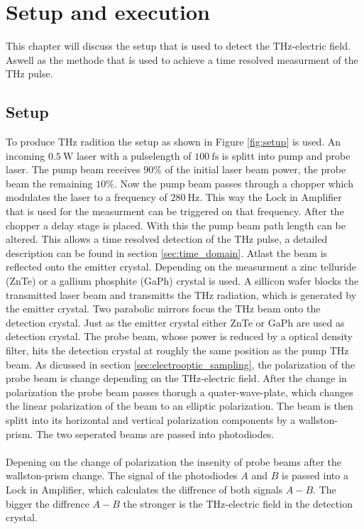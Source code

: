 \chapter{Setup and execution}
This chapter will discuss the setup that is used to detect the $\si{\tera\hertz}$-electric field.
Aswell as the methode that ís used to achieve a time resolved measurment of the $\si{\tera\hertz}$ pulse.

\section{Setup}
\label{sec:setup}
To produce $\si{\tera\hertz}$ radition the setup as shown in Figure \ref{fig:setup} is used.
An incoming $\SI{0.5}{\W}$ laser with a pulselength of $\SI{100}{\femto\second}$ is splitt into pump and probe laser.
The pump beam receives $90\%$ of the initial laser beam power, the probe beam the remaining $10\%$.
Now the pump beam passes through a chopper which modulates the laser to a frequency of $\SI{280}{\hertz}$.
This way the Lock in Amplifier that is used for the measurment can be triggered on that frequency.
After the chopper a delay stage is placed.
With this the pump beam path length can be altered.
This allows a time resolved detection of the $\si{\tera\hertz}$ pulse, a detailed description can be found in section \ref{sec:time_domain}.
Atlast the beam is reflected onto the emitter crystal.
Depending on the measurment a zinc telluride (ZnTe) or a gallium phosphite (GaPh) crystal is used.
A sillicon wafer blocks the transmitted laser beam and transmitts the $\si{\tera\hertz}$ radiation, which is generated by the emitter crystal.
Two parabolic mirrors focus the $\si{\tera\hertz}$ beam onto the detection crystal.
Just as the emitter crystal either ZnTe or GaPh are used as detection crystal.
The probe beam, whose power is reduced by a optical density filter, hits the detection crystal at roughly the same position as the pump $\si{\tera\hertz}$ beam.
As dicussed in section \ref{sec:electrooptic_sampling}, the polarization of the probe beam is change depending on the $\si{\tera\hertz}$-electric field.
After the change in polarization the probe beam passes thorugh a quater-wave-plate, which changes the linear polarization of the beam to an elliptic polarization.
The beam is then splitt into its horizontal and vertical polarization components by a wallston-prism.
The two seperated beams are passed into photodiodes.
\\\\
Depening on the change of polarization the insenity of probe beams after the wallston-prism change.
The signal of the photodiodes $A$ and $B$ is passed into a Lock in Amplifier, which calculates the diffrence of both signals $A-B$.
The bigger the diffrence $A-B$ the stronger is the $\si{\tera\hertz}$-electric field in the detection crystal.

